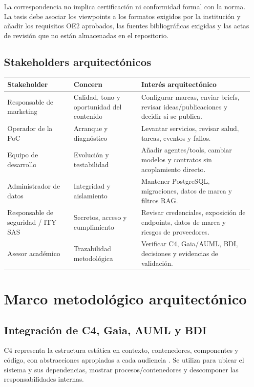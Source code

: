 \documentclass[12pt,oneside]{report}
\begin{document}
La correspondencia no implica certificación ni conformidad formal con la norma. La tesis debe asociar los viewpoints a los formatos exigidos por la institución y añadir los requisitos OE2 aprobados, las fuentes bibliográficas exigidas y las actas de revisión que no están almacenadas en el repositorio.

\subsection{Stakeholders arquitectónicos}
\begin{longtable}{p{3.2cm}p{4.1cm}p{7.0cm}}
\toprule
Stakeholder & Concern & Interés arquitectónico \\
\midrule
Responsable de marketing & Calidad, tono y oportunidad del contenido & Configurar marcas, enviar briefs, revisar ideas/publicaciones y decidir si se publica. \\
Operador de la PoC & Arranque y diagnóstico & Levantar servicios, revisar salud, tareas, eventos y fallos. \\
Equipo de desarrollo & Evolución y testabilidad & Añadir agentes/tools, cambiar modelos y contratos sin acoplamiento directo. \\
Administrador de datos & Integridad y aislamiento & Mantener PostgreSQL, migraciones, datos de marca y filtros RAG. \\
Responsable de seguridad / ITY SAS & Secretos, acceso y cumplimiento & Revisar credenciales, exposición de endpoints, datos de marca y riesgos de proveedores. \\
Asesor académico & Trazabilidad metodológica & Verificar C4, Gaia/AUML, BDI, decisiones y evidencias de validación. \\
\bottomrule
\end{longtable}

\section{Marco metodológico arquitectónico}

\subsection{Integración de C4, Gaia, AUML y BDI}
C4 representa la estructura estática en contexto, contenedores, componentes y código, con abstracciones apropiadas a cada audiencia \cite{brownc4}. Se utiliza para ubicar el sistema y sus dependencias, mostrar procesos/contenedores y descomponer las responsabilidades internas.
\end{document}
